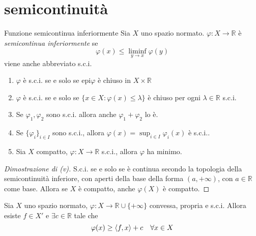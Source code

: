 \section{semicontinuità}
\begin{definition}{Funzione semicontinua inferiormente}
    Sia \(X\) uno spazio normato.
    \(\varphi : X \to \mathbb{R}\) è \emph{semicontinua inferiormente} se
    \[
      \varphi {(x)} \le \liminf_{y \to x} \varphi {(y)}
    \]
    viene anche abbreviato s.c.i.
\end{definition}
\begin{proposition}
\begin{enumerate}[label = (\roman*)]
    \item \(\varphi \) è s.c.i. se e solo se \(\mathrm{epi}\varphi \) è chiuso in \(X \times \mathbb{R}\) 
    \item \(\varphi \) è s.c.i. se e solo se \(\{x \in X : \varphi {(x)} \le \lambda\} \) è chiuso per ogni \(\lambda \in \mathbb{R}\) s.c.i.
    \item Se \(\varphi_{1}, \varphi_{2}\) sono s.c.i.
        allora anche \(\varphi_{1} + \varphi_{2}\) lo è.

    \item Se \(\{\varphi_i\}_{i \in I}\) sono s.c.i., allora \(\varphi{(x)} = \sup_{i \in I} \varphi_i{(x)}\) è s.c.i..
    \item Sia \(X\) compatto, \(\varphi : X \to \mathbb{R}\) s.c.i., allora \(
        \varphi \) ha minimo.
\end{enumerate}
\end{proposition}
\begin{proof}[Dimostrazione di (v)]
    S.c.i. se e solo se è continua secondo la topologia della semicontinuità
    inferiore, con aperti della base della forma \((a, +\infty)\), con \(a \in \mathbb{R}
    \)  come base. Allora se \(X\) è compatto, anche \(\varphi{(X)}\) è compatto. 
\end{proof}
\begin{theorem}{}
    Sia \(X\) uno spazio normato, \(\varphi  : X \to \mathbb{R} \cup \{+\infty\} \) convessa, propria e s.c.i. Allora esiste \(f \in X'\) e \(\exists c \in \mathbb{R}\) tale che
    \[
      \varphi  {(x)} \ge {\left\langle f, x\right\rangle} + c \quad \forall x \in X
    \]
\end{theorem}




